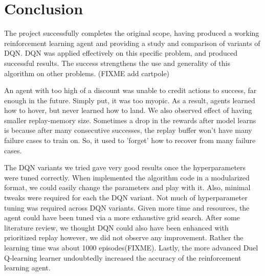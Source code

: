 \section{Conclusion}
\label{sec:conclusion}

The project successfully completes the original scope, having produced a working reinforcement learning agent and providing a study and comparison of variants of DQN. DQN was applied effectively on this specific problem, and produced successful results. The success strengthens the use and generality of this algorithm on other problems. (FIXME add  cartpole)

An agent with too high of a discount was unable to credit actions to success, far enough in the future. Simply put, it was too myopic. As a result, agents learned how to hover, but never learned how to land. We also observed effect of having smaller replay-memory size. Sometimes a drop in the rewards after model learns is because after many consecutive successes, the replay buffer won't have many failure cases to train on. So, it used to 'forget' how to recover from many failure cases.

The DQN variants we tried gave very good results once the hyperparameters were tuned correctly. When implemented the algorithm code in a modularized format, we could easily change the parameters and play with it. Also, minimal tweaks were required for each the DQN variant. Not much of hyperparameter tuning was required across DQN variants. Given more time and resources, the agent could have been tuned via a more exhaustive grid search. After some literature review, we thought DQN could also have been enhanced with prioritized replay however, we did not observe any improvement. Rather the learning time was about 1000 episodes(FIXME). Lastly, the more advanced Duel Q-learning learner undoubtedly increased the accuracy of the reinforcement learning agent. 